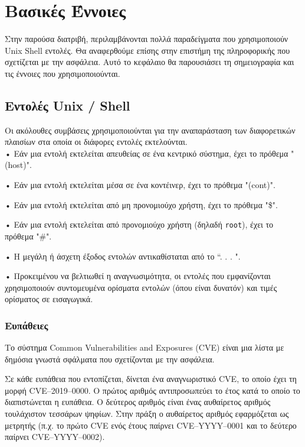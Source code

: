 \chapter{Βασικές Έννοιες}
\label{basicConcepts}

Στην παρούσα διατριβή, περιλαμβάνονται πολλά παραδείγματα που χρησιμοποιούν
\textlatin{Unix Shell} εντολές. Θα αναφερθούμε επίσης στην επιστήμη της
πληροφορικής που σχετίζεται με την ασφάλεια. Αυτό το κεφάλαιο θα παρουσιάσει
τη σημειογραφία και τις έννοιες που χρησιμοποιούνται.

\section{Εντολές \textlatin{Unix / Shell}}

Οι ακόλουθες συμβάσεις χρησιμοποιούνται για την αναπαράσταση των διαφορετικών
πλαισίων στα οποία οι διάφορες εντολές εκτελούνται. \\

• Εάν μια εντολή εκτελείται απευθείας σε ένα κεντρικό σύστημα, έχει το πρόθεμα
"(\textlatin{host})".

• Εάν μια εντολή εκτελείται μέσα σε ένα κοντέινερ, έχει το πρόθεμα
"(\textlatin{cont})".

• Εάν μια εντολή εκτελείται από μη προνομιούχο χρήστη, έχει το πρόθεμα
"\$".

• Εάν μια εντολή εκτελείται από προνομιούχο χρήστη (δηλαδή 
\texttt{\textlatin{root}}), έχει το πρόθεμα "\#".

• Η μεγάλη ή άσχετη έξοδος εντολών αντικαθίσταται από το “. . . ".

• Προκειμένου να βελτιωθεί η αναγνωσιμότητα, οι εντολές που εμφανίζονται
χρησιμοποιούν συντομευμένα ορίσματα εντολών (όπου είναι δυνατόν) και τιμές
ορίσματος σε εισαγωγικά.

\subsection{Ευπάθειες}

Το σύστημα \textlatin{Common Vulnerabilities and Exposures (CVE)} είναι μια
λίστα με δημόσια γνωστά σφάλματα που σχετίζονται με την ασφάλεια.

Σε κάθε ευπάθεια που εντοπίζεται, δίνεται ένα αναγνωριστικό \textlatin{CVE}, το
οποίο έχει τη μορφή \textlatin{CVE–2019–0000}. Ο πρώτος αριθμός
αντιπροσωπεύει το έτος κατά το οποίο το διαπιστώνεται η ευπάθεια. Ο δεύτερος
αριθμός είναι ένας αυθαίρετος αριθμός τουλάχιστον τεσσάρων ψηφίων. Στην πράξη ο
αυθαίρετος αριθμός εφαρμόζεται ως μετρητής (π.χ. το πρώτο \textlatin{CVE} ενός
έτους παίρνει \textlatin{CVE–YYYY–0001} και το δεύτερο παίρνει
\textlatin{CVE–YYYY–0002)}.

